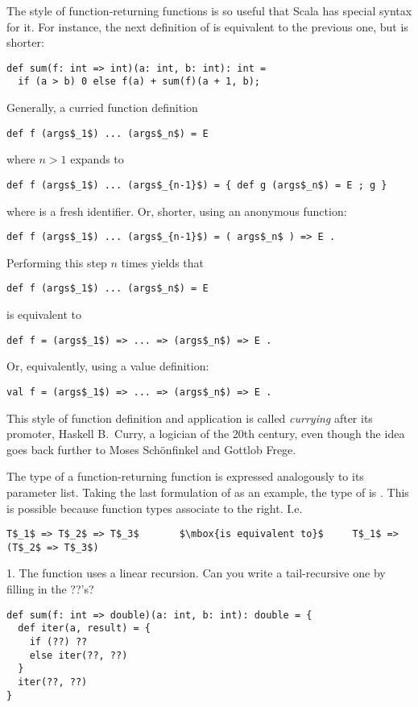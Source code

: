 The style of function-returning functions is so useful that Scala has
special syntax for it. For instance, the next definition of 
is equivalent to the previous one, but is shorter:
\begin{lstlisting}
def sum(f: int => int)(a: int, b: int): int =
  if (a > b) 0 else f(a) + sum(f)(a + 1, b);
\end{lstlisting}
Generally, a curried function definition 
\begin{lstlisting}
def f (args$_1$) ... (args$_n$) = E
\end{lstlisting}
where $n > 1$ expands to
\begin{lstlisting}
def f (args$_1$) ... (args$_{n-1}$) = { def g (args$_n$) = E ; g }
\end{lstlisting}
where  is a fresh identifier. Or, shorter, using an anonymous function:
\begin{lstlisting}
def f (args$_1$) ... (args$_{n-1}$) = ( args$_n$ ) => E .
\end{lstlisting}
Performing this step $n$ times yields that
\begin{lstlisting}
def f (args$_1$) ... (args$_n$) = E
\end{lstlisting}
is equivalent to
\begin{lstlisting}
def f = (args$_1$) => ... => (args$_n$) => E .
\end{lstlisting}
Or, equivalently, using a value definition:
\begin{lstlisting}
val f = (args$_1$) => ... => (args$_n$) => E .
\end{lstlisting}
This style of function definition and application is called {\em
currying} after its promoter, Haskell B.\ Curry, a logician of the
20th century, even though the idea goes back further to Moses
Sch\"onfinkel and Gottlob Frege.

The type of a function-returning function is expressed analogously to
its parameter list. Taking the last formulation of  as an example,
the type of  is .
This is possible because function types associate to the right. I.e.
\begin{lstlisting}
T$_1$ => T$_2$ => T$_3$       $\mbox{is equivalent to}$     T$_1$ => (T$_2$ => T$_3$)
\end{lstlisting}


\begin{exercise}
1. The  function uses a linear recursion. Can you write a
tail-recursive one by filling in the ??'s?

\begin{lstlisting}
def sum(f: int => double)(a: int, b: int): double = {
  def iter(a, result) = {
    if (??) ??
    else iter(??, ??)
  }
  iter(??, ??)
}
\end{lstlisting}
\end{exercise}


